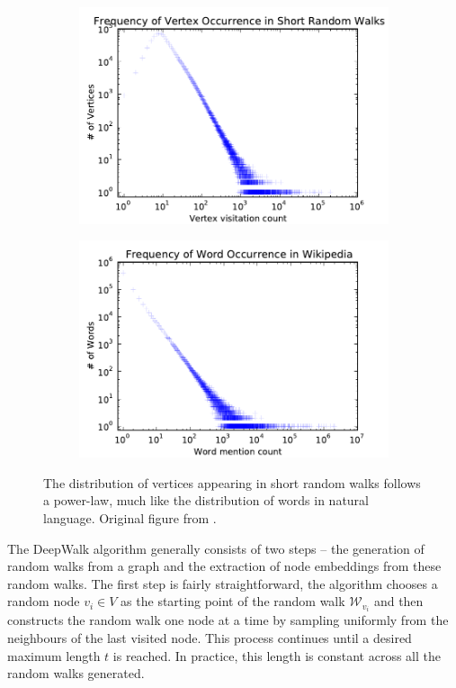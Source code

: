 \begin{figure}
	\begin{subfigure}{0.49\linewidth}
		\includegraphics[width=\linewidth]{images/deepwalk-motivation/youtube-powerlaw.pdf}
	\end{subfigure}
	\begin{subfigure}{0.49\linewidth}
		\includegraphics[width=\linewidth]{images/deepwalk-motivation/wiki-powerlaw.pdf}
	\end{subfigure}
	\caption{The distribution of vertices appearing in short random walks follows a power-law, much like the distribution of words in natural language. Original figure from \cite{perozzi_deepwalk_2014}.}
	\label{fig:deepwalk-motivation}
\end{figure}

The DeepWalk algorithm generally consists of two steps -- the generation of random walks from a graph and the extraction of node embeddings from these random walks. The first step is fairly straightforward, the algorithm chooses a random node \( v_i \in V \) as the starting point of the random walk \( \mathcal{W}_{v_i} \) and then constructs the random walk one node at a time by sampling uniformly from the neighbours of the last visited node. This process continues until a desired maximum length \( t \) is reached. In practice, this length is constant across all the random walks generated.

